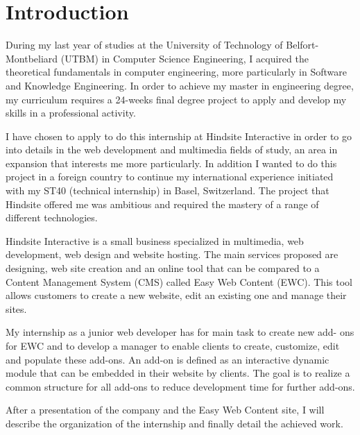 \chapter{Introduction}

During my last year of studies at the University of Technology of Belfort-
Montbeliard (UTBM) in Computer Science Engineering, I acquired the
theoretical fundamentals in computer engineering, more particularly in
Software and Knowledge Engineering. In order to achieve my master in
engineering degree, my curriculum requires a 24-weeks final degree project to
apply and develop my skills in a professional activity.

I have chosen to apply to do this internship at Hindsite Interactive in order to
go into details in the web development and multimedia fields of study, an area
in expansion that interests me more particularly. In addition I wanted to do this
project in a foreign country to continue my international experience initiated
with my ST40 (technical internship) in Basel, Switzerland. The project that
Hindsite offered me was ambitious and required the mastery of a range of
different technologies.

Hindsite Interactive is a small business specialized in multimedia, web
development, web design and website hosting. The main services proposed
are designing, web site creation and an online tool that can be compared to a
Content Management System (CMS) called Easy Web Content (EWC). This
tool allows customers to create a new website, edit an existing one and
manage their sites.

My internship as a junior web developer has for main task to create new add-
ons for EWC and to develop a manager to enable clients to create, customize,
edit and populate these add-ons. An add-on is defined as an interactive
dynamic module that can be embedded in their website by clients. The goal is
to realize a common structure for all add-ons to reduce development time for
further add-ons.

After a presentation of the company and the Easy Web Content site, I will
describe the organization of the internship and finally detail the achieved work.

\clearpage
